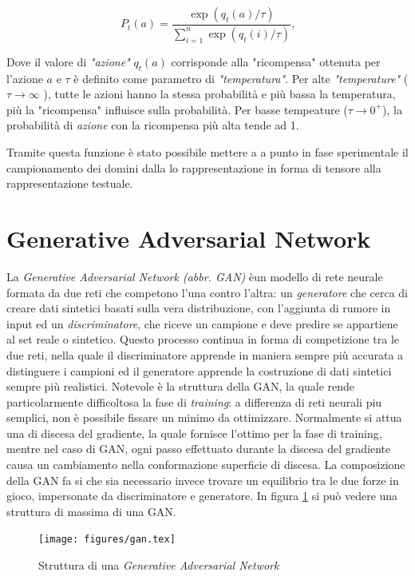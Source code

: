\[P_t(a) = \frac{\exp(q_t(a)/\tau)}{\sum_{i=1}^n\exp(q_t(i)/\tau)} \text{,}\]

Dove il valore di\textit{ "azione"} $q_{t}(a)$ corrisponde alla "ricompensa" ottenuta per l'azione $a$ e $\tau$  è definito come parametro di \textit{"temperatura"}. Per alte \textit{"temperature"} ( $\tau \to \infty$ ), tutte le azioni hanno la stessa probabilità e più bassa la temperatura, più la "ricompensa" influisce sulla probabilità. Per basse tempeature ($\tau \to 0^{+}$), la probabilità di \textit{azione} con la ricompensa più alta tende ad 1. 

Tramite questa funzione è stato possibile mettere a a punto in fase sperimentale il campionamento dei domini dalla lo rappresentazione in forma di tensore alla rappresentazione testuale.

\section{Generative Adversarial Network}
\label{ganintro}
La \textit{Generative Adversarial Network (abbr. GAN)} èun modello di rete neurale formata da due reti che competono l'una contro l'altra: un \textit{generatore} che cerca di creare dati sintetici basati sulla vera distribuzione, con l'aggiunta di rumore in input ed un \textit{discriminatore}, che riceve un campione e deve predire se appartiene al set reale o sintetico. Questo processo continua in forma di competizione tra le due reti, nella quale il discriminatore apprende in maniera sempre più accurata a distinguere i campioni ed il generatore apprende la costruzione di dati sintetici sempre più realistici. Notevole è la struttura della GAN, la quale rende particolarmente difficoltosa la fase di \textit{training}: a differenza di reti neurali piu semplici, non è possibile fissare un minimo da ottimizzare. Normalmente si attua una di discesa del gradiente, la quale fornisce l'ottimo per la fase di training, mentre nel caso di GAN, ogni passo effettuato durante la discesa del gradiente causa un cambiamento nella conformazione superficie di discesa. La composizione della GAN fa si che sia necessario invece trovare un equilibrio tra le due forze in gioco, impersonate da discriminatore e generatore. In figura \ref{fig:gan} si può vedere una struttura di massima di una GAN.

\begin{figure}[!htb]
    \centering
	\texttt{[image: figures/gan.tex]}
	\caption{Struttura di una \textit{Generative Adversarial Network}}
\label{fig:gan}
\end{figure}


